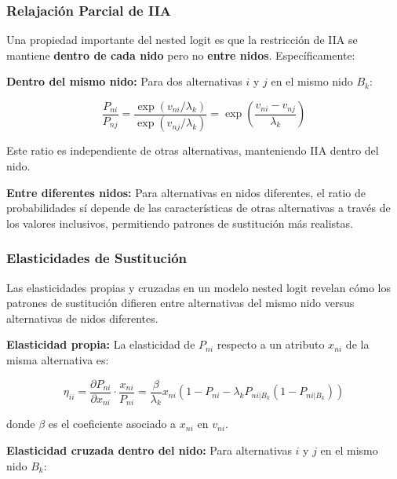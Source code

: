 \documentclass[
]{book}
\begin{document}
\hypertarget{relajaciuxf3n-parcial-de-iia}{%
\subsubsection{Relajación Parcial de IIA}\label{relajaciuxf3n-parcial-de-iia}}

Una propiedad importante del nested logit es que la restricción de IIA se mantiene \textbf{dentro de cada nido} pero no \textbf{entre nidos}. Específicamente:

\textbf{Dentro del mismo nido:} Para dos alternativas \(i\) y \(j\) en el mismo nido \(B_k\):

\begin{equation}
\frac{P_{ni}}{P_{nj}} = \frac{\exp(v_{ni}/\lambda_k)}{\exp(v_{nj}/\lambda_k)} = \exp\left(\frac{v_{ni} - v_{nj}}{\lambda_k}\right)
\label{eq:ratiowithin}
\end{equation}

Este ratio es independiente de otras alternativas, manteniendo IIA dentro del nido.

\textbf{Entre diferentes nidos:} Para alternativas en nidos diferentes, el ratio de probabilidades sí depende de las características de otras alternativas a través de los valores inclusivos, permitiendo patrones de sustitución más realistas.

\hypertarget{elasticidades-de-sustituciuxf3n}{%
\subsubsection{Elasticidades de Sustitución}\label{elasticidades-de-sustituciuxf3n}}

Las elasticidades propias y cruzadas en un modelo nested logit revelan cómo los patrones de sustitución difieren entre alternativas del mismo nido versus alternativas de nidos diferentes.

\textbf{Elasticidad propia:} La elasticidad de \(P_{ni}\) respecto a un atributo \(x_{ni}\) de la misma alternativa es:

\begin{equation}
\eta_{ii} = \frac{\partial P_{ni}}{\partial x_{ni}} \cdot \frac{x_{ni}}{P_{ni}} = \frac{\beta}{\lambda_k} x_{ni} \left(1 - P_{ni} - \lambda_k P_{ni|B_k}(1 - P_{ni|B_k})\right)
\label{eq:elastown}
\end{equation}

donde \(\beta\) es el coeficiente asociado a \(x_{ni}\) en \(v_{ni}\).

\textbf{Elasticidad cruzada dentro del nido:} Para alternativas \(i\) y \(j\) en el mismo nido \(B_k\):
\end{document}
